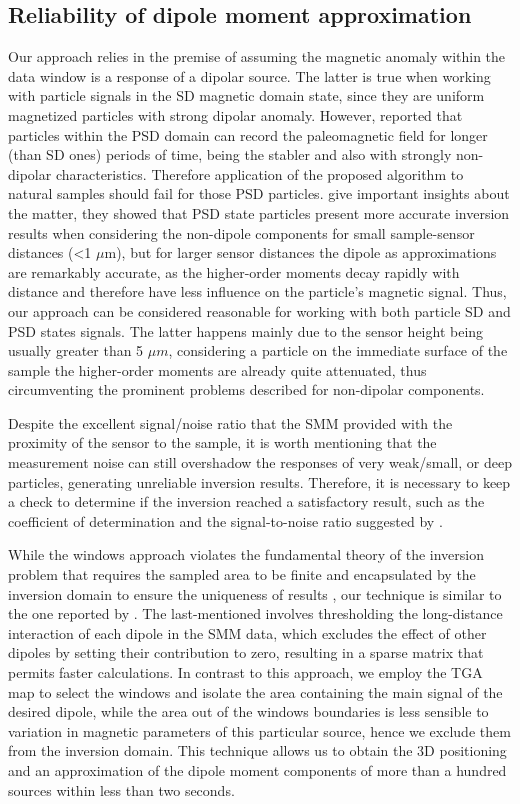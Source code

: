 \subsection{Reliability of dipole moment approximation}
Our approach relies in the premise of assuming the magnetic anomaly within 
the data window is a response of a dipolar source. The latter is true when working 
with particle signals in the SD magnetic domain state, since they are uniform magnetized 
particles with strong dipolar anomaly. However, \cite{Nagy2017} reported
that particles within the PSD domain can record the paleomagnetic field for longer (than SD ones) periods
of time, being the stabler and also with strongly non-dipolar characteristics. 
Therefore application of the proposed algorithm to natural samples should fail for those PSD
particles. \cite{CortesOrtuno2022} give important insights about the matter, they 
showed that PSD state particles present more accurate inversion results when considering the non-dipole components for
small sample-sensor distances (\textless 1 $\mu$m), but for larger sensor
distances the dipole as approximations are remarkably accurate, as the
higher-order moments decay rapidly with distance and therefore have less
influence on the particle's magnetic signal. Thus, our approach can be
considered reasonable for working with both particle SD and PSD states signals. 
The latter happens mainly due to the sensor height being
usually greater than 5 $\mu m$, considering a particle on the immediate
surface of the sample the higher-order moments are already quite attenuated, thus 
circumventing the prominent problems described for non-dipolar components.

Despite the excellent signal/noise ratio that the SMM provided with the
proximity of the sensor to the sample, it is worth mentioning that the
measurement noise can still overshadow the responses of very weak/small, or
deep particles, generating unreliable inversion results. Therefore, it is
necessary to keep a check to determine if the inversion reached a satisfactory
result, such as the coefficient of determination and the
signal-to-noise ratio suggested by \citep{CortesOrtuno2021}.

While the windows approach violates the fundamental theory of the inversion problem that 
requires the sampled area to be finite and encapsulated by the inversion domain to ensure 
the uniqueness of results \citep{Baratchart2013,Lima2013}, our technique is similar to the 
one reported by \cite{Weiss2007}. The last-mentioned involves thresholding the long-distance interaction 
of each dipole in the SMM data, which excludes the effect of other dipoles by setting their 
contribution to zero, resulting in a sparse matrix that permits faster calculations. In contrast 
to this approach, we employ the TGA map to select the windows and isolate the area containing 
the main signal of the desired dipole, while the area out of the windows boundaries is less sensible to 
variation in magnetic parameters of this particular source, hence we exclude them from the inversion 
domain. This technique allows us to obtain the 3D positioning and an approximation of the dipole moment 
components of more than a hundred sources within less than two seconds.


